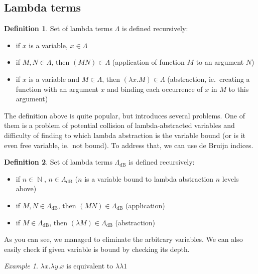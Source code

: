 \documentclass[final]{article}
\theoremstyle{definition}
\newtheorem{definition}{Definition}[subsection]
\theoremstyle{remark}
\newtheorem{example}{Example}[subsection]
\newcommand{\LambdadB}{\ensuremath{\Lambda_{\text{dB}}}}
\DeclareMathOperator{\N}{\mathbb{N}}
\begin{document}
\subsection{Lambda terms}%
\label{sub:lambda_terms}

\begin{definition}
    Set of lambda terms \(\Lambda\) is defined recursively:
    \begin{itemize}
        \item if \(x\) is a variable, \(x \in \Lambda\)
        \item if \(M, N \in \Lambda\), then \((M N) \in \Lambda\) (application of function \(M\) to an argument \(N\))
        \item if \(x\) is a variable and \(M \in \Lambda\), then \((\lambda x . M) \in \Lambda\) (abstraction, ie.\ creating a function with an argument \(x\) and binding each occurrence of \(x\) in \(M\) to this argument)
    \end{itemize}
\end{definition}

The definition above is quite popular, but introduces several problems. One of them is a problem of potential collision of lambda-abstracted variables and difficulty of finding to which lambda abstraction is the variable bound (or is it even free variable, ie.\ not bound). To address that, we can use de Bruijn indices.

\begin{definition}
    Set of lambda terms \(\LambdadB\) is defined recursively:
    \begin{itemize}
        \item if \(n \in \N\), \(n \in \LambdadB\) (\(n\) is a variable bound to lambda abstraction \(n\) levels above)
        \item if \(M, N \in \LambdadB\), then \((M N) \in \LambdadB\) (application)
        \item if \(M \in \LambdadB\), then \((\lambda M) \in \LambdadB\) (abstraction)
    \end{itemize}
\end{definition}

As you can see, we managed to eliminate the arbitrary variables. We can also easily check if given variable is bound by checking its depth.

\begin{example}
    \(\lambda x . \lambda y . x\) is equivalent to \(\lambda \lambda 1\)
\end{example}
\end{document}
